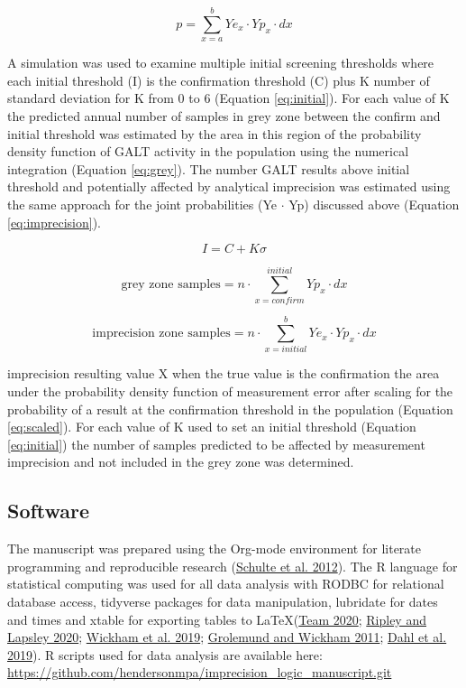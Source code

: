 \documentclass[review]{elsarticle}
\begin{document}
\begin{equation}\label{eq:joint}
p = \sum_{x=a}^b Ye_x \cdot Yp_x \cdot dx
\end{equation}

A simulation was used to examine multiple initial screening thresholds
where each initial threshold (I) is the confirmation threshold (C)
plus K number of standard deviation for K from 0 to 6 (Equation
\ref{eq:initial}). For each value of K the predicted annual number of
samples in grey zone between the confirm and initial threshold was
estimated by the area in this region of the probability density
function of GALT activity in the population using the numerical
integration (Equation \ref{eq:grey}). The number GALT results above
initial threshold and potentially affected by analytical imprecision
was estimated using the same approach for the joint probabilities (Ye
\(\cdot\) Yp) discussed above (Equation \ref{eq:imprecision}).

\begin{equation}\label{eq:initial}
I = C + K\sigma 
\end{equation}

\begin{equation}\label{eq:grey}
\text{grey zone samples}  =  n \cdot \sum_{x=confirm}^{initial} Yp_x \cdot dx
\end{equation}

\begin{equation}\label{eq:imprecision}
\text{imprecision zone samples}  =  n \cdot \sum_{x=initial}^b Ye_x \cdot Yp_x \cdot dx
\end{equation}

imprecision resulting value X when the true value is the confirmation
the area under the probability density function of measurement error
after scaling for the probability of a result at the confirmation
threshold in the population (Equation \ref{eq:scaled}). For each
value of K used to set an initial threshold (Equation
\ref{eq:initial}) the number of samples predicted to be affected by
measurement imprecision and not included in the grey zone was
determined.

\subsection*{Software}
\label{sec:org6b21a16}
The manuscript was prepared using the Org-mode environment for
literate programming and reproducible research (\hyperlink{citeproc_bib_item_8}{Schulte et al. 2012}). The R language for statistical computing was used
for all data analysis with RODBC for relational database access,
tidyverse packages for data manipulation, lubridate for dates and
times and xtable for exporting tables to
\LaTeX (\hyperlink{citeproc_bib_item_10}{Team 2020}; \hyperlink{citeproc_bib_item_7}{Ripley and Lapsley 2020}; \hyperlink{citeproc_bib_item_12}{Wickham et al. 2019}; \hyperlink{citeproc_bib_item_5}{Grolemund and Wickham 2011}; \hyperlink{citeproc_bib_item_3}{Dahl et al. 2019}). R scripts
used for data analysis are available here:
\url{https://github.com/hendersonmpa/imprecision\_logic\_manuscript.git}
\end{document}
